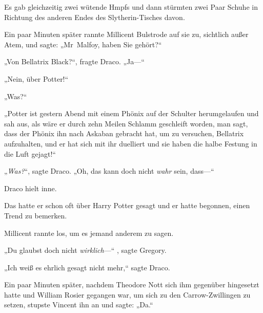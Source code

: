 Es gab gleichzeitig zwei wütende Hmpfs und dann stürmten zwei Paar Schuhe in Richtung des anderen Endes des Slytherin-Tisches davon.

Ein paar Minuten später rannte Millicent Bulstrode auf sie zu, sichtlich außer Atem, und sagte: „Mr~Malfoy, haben Sie gehört?“

„Von Bellatrix Black?“, fragte Draco. „Ja—“

„Nein, über Potter!“

„Was?“

„Potter ist gestern Abend mit einem Phönix auf der Schulter herumgelaufen und sah aus, als wäre er durch zehn Meilen Schlamm geschleift worden, man sagt, dass der Phönix ihn nach Askaban gebracht hat, um zu versuchen, Bellatrix aufzuhalten, und er hat sich mit ihr duelliert und sie haben die halbe Festung in die Luft gejagt!“

„\emph{Was?}“, sagte Draco. „Oh, das kann doch nicht \emph{wahr} sein, dass—“

Draco hielt inne.

Das hatte er schon oft über Harry Potter gesagt und er hatte begonnen, einen Trend zu bemerken.

Millicent rannte los, um es jemand anderem zu sagen.

„Du glaubst doch nicht \emph{wirklich}—“ , sagte Gregory.

„Ich weiß es ehrlich gesagt nicht mehr,“ sagte Draco.

Ein paar Minuten später, nachdem Theodore Nott sich ihm gegenüber hingesetzt hatte und William Rosier gegangen war, um sich zu den Carrow-Zwillingen zu setzen, stupste Vincent ihn an und sagte: „Da.“

